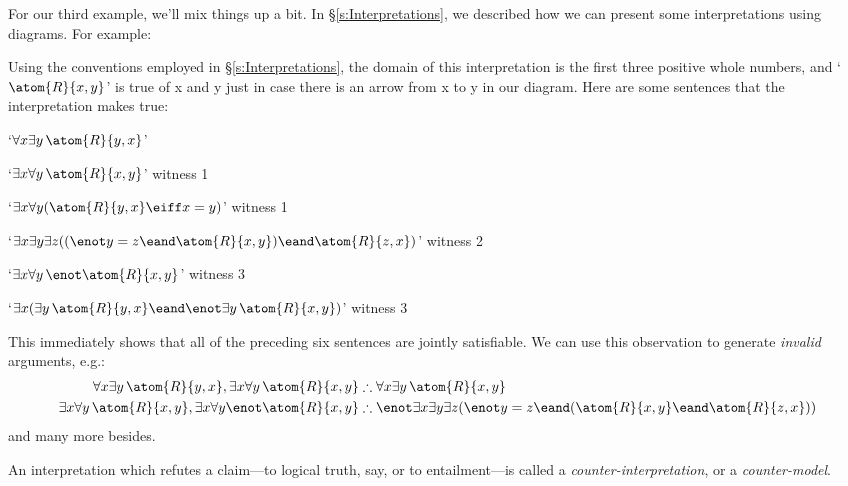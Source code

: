 For our third example, we'll mix things up a bit. In \S\ref{s:Interpretations}, we described how we can present some interpretations using diagrams. For example:
\begin{center}
\end{center}
Using the conventions employed in \S\ref{s:Interpretations}, the domain of this interpretation is the first three positive whole numbers, and `$\atom{R}{x,y}$' is true of x and y just in case there is an arrow from x to y in our diagram. Here are some sentences that the interpretation makes true:
\begin{ebullet}
	\item `$\forall x \exists y\, \atom{R}{y,x}$' 
	\item `$\exists x \forall y\, \atom{R}{x,y}$' \hfill witness 1
	\item `$\exists x \forall y (\atom{R}{y,x} \eiff x = y)$' \hfill witness 1
	\item `$\exists x \exists y \exists z ((\enot y = z \eand \atom{R}{x,y}) \eand \atom{R}{z,x})$' \hfill witness 2
	\item `$\exists x \forall y\, \enot \atom{R}{x,y}$' \hfill witness 3
	\item `$\exists x (\exists y\, \atom{R}{y,x} \eand \enot \exists y\, \atom{R}{x,y})$' \hfill witness 3
\end{ebullet}
This immediately shows that all of the preceding six sentences are jointly satisfiable. We can use this observation to generate \emph{invalid} arguments, e.g.:
\begin{align*}
	\forall x \exists y\, \atom{R}{y,x}, \exists x \forall y\, \atom{R}{x,y}  &\therefore  \forall x \exists y\, \atom{R}{x,y}\\
	\exists x \forall y\, \atom{R}{x,y}, \exists x \forall y \enot \atom{R}{x,y} & \therefore \enot \exists x \exists y \exists z (\enot y = z \eand (\atom{R}{x,y} \eand \atom{R}{z,x}))
\end{align*}
and many more besides.

An interpretation which refutes a claim---to logical truth, say, or to entailment---is called a \emph{counter-interpretation}, or a \emph{counter-model}.

